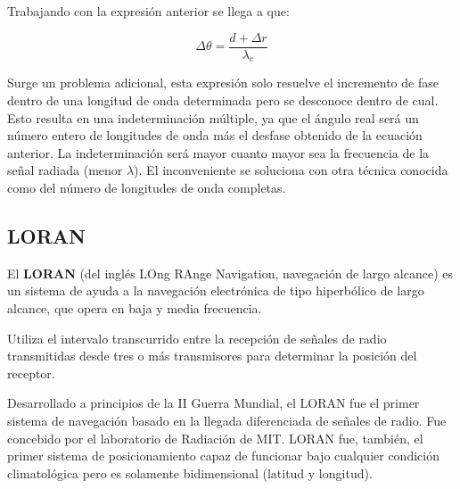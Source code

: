 \begin{description}
Trabajando con la expresi\'on anterior se llega a que:

\[
\Delta \theta = \displaystyle \frac{d+\Delta r}{\lambda_c}
\]

Surge un problema adicional, esta expresi\'on solo resuelve el incremento de fase dentro de una longitud de onda determinada pero se desconoce dentro de cual. 
Esto resulta en una indeterminaci\'on m\'ultiple, ya que el \'angulo real ser\'a un n\'umero entero de longitudes de onda m\'as el desfase obtenido de la ecuaci\'on anterior. 
La indeterminaci\'on ser\'a mayor cuanto mayor sea la frecuencia de la se\~nal radiada (menor $\lambda$). 
El inconveniente se soluciona con otra t\'ecnica conocida como del n\'umero de longitudes de onda completas.


\end{description}


\subsection{LORAN}
\label{sec:06.loran}



El \textbf{LORAN} (del ingl\'es LOng RAnge Navigation, navegaci\'on de largo alcance) es un sistema de ayuda a la navegaci\'on electr\'onica de tipo hiperb\'olico
 de largo alcance, que opera en baja y media frecuencia. 

Utiliza el intervalo transcurrido entre la recepci\'on de se\~nales de radio transmitidas desde tres o m\'as transmisores para determinar la posici\'on del receptor. 

Desarrollado a principios de la II Guerra Mundial, el LORAN fue el primer sistema de navegaci\'on basado en la llegada diferenciada de se\~nales de radio. Fue concebido por el laboratorio de Radiaci\'on de MIT. LORAN fue, tambi\'en, el primer sistema de posicionamiento capaz de funcionar bajo cualquier condici\'on climatol\'ogica pero es solamente bidimensional (latitud y longitud).

